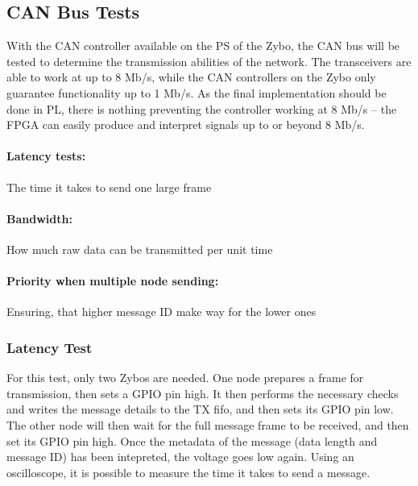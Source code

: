 
\subsection{CAN Bus Tests}
With the CAN controller available on the PS of the Zybo, the CAN bus will be tested to determine the transmission abilities of the network.
The transceivers are able to work at up to 8 Mb/s, while the CAN controllers on the Zybo only guarantee functionality up to 1 Mb/s. 
As the final implementation should be done in PL, there is nothing preventing the controller working at 8 Mb/s -- the FPGA can easily produce and interpret signals up to or beyond 8 Mb/s.

\paragraph{Latency tests:} The time it takes to send one large frame
 

\paragraph{Bandwidth:} How much raw data can be transmitted per unit time



\paragraph{Priority when multiple node sending:} Ensuring, that higher message ID make way for the lower ones 

\subsubsection{Latency Test}\label{sub:CAN_latency}
For this test, only two Zybos are needed.
One node prepares a frame for transmission, then sets a GPIO pin high.
It then performs the necessary checks and writes the message details to the TX fifo, and then sets its GPIO pin low. \\
The other node will then wait for the full message frame to be received, and then set its GPIO pin high.
Once the metadata of the message (data length and message ID) has been intepreted, the voltage goes low again.
Using an oscilloscope, it is possible to measure the time it takes to send a message.\\

